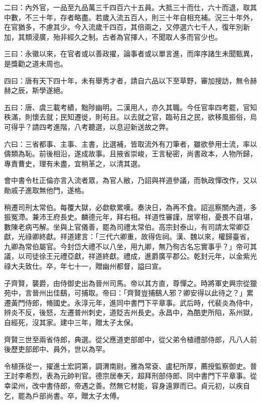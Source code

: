 \begin{pinyinscope}
 二曰：內外官，一品至九品萬三千四百六十五員。大抵三十而仕，六十而退，取其中數，不三十年，存者略盡。若歲入流五百人，則三十年自相充補。況三十年外，在官猶多，不慮其少。今入流歲千四百，其倍兩之，又停選六七千人，復年別新加，其類浸廣，殆非經久之制。古者為官擇人，不聞取人多而官少也。



 三曰：永徽以來，在官者或以善政擢，論事者或以單言進，而庠序諸生未聞甄異，是獎勸之道未周也。



 四曰：唐有天下四十年，未有舉秀才者，請自六品以下至草野，審加搜訪，無令赫赫之辰，斯學遂絕。



 五曰：唐、虞三載考績，黜陟幽明。二漢用人，亦久其職。今任官率四考罷，官知秩滿，則懷去就；民知遷徙，則茍且。以去就之官，臨茍且之民，欲移風振俗，烏可得乎？請四考進階，八考聽選，以息迎新送故之弊。



 六曰：三省都事、主事、主書，比選補，皆取流外有刀筆者，雖欲參用士流，率以儔類為恥。前後相沿，遂成故事。且掖省崇峻，王言秘密，尚書政本，人物所歸，專責曹史，理有未盡，宜稍革之，以清其選。



 會中書令杜正倫亦言入流者眾，為官人敝，乃詔與祥道參議，而執政憚改作，又以勛戚子進取無他門，遂格。



 稍遷司刑太常伯。每覆大獄，必歔欷累嘆。奏決日，為再不食。詔巡察關內道，多振冤滯。兼沛王府長史。麟德元年，拜右相。祥道性審謹，居宰相，憂畏不自堪，數陳老病丐解。坐與上官儀善，罷為司禮太常伯。高宗封泰山，有司請太常卿亞獻，光祿卿終獻。祥道建言：「三代六卿重，故得佐祠。漢、魏以來，權歸臺省，九卿為常伯屬官。今封岱大禮不以八坐，用九卿，無乃徇古名忘實事乎？」帝可其議，以司徒徐王元禮亞獻，祥道終獻。禮成，進爵廣平郡公。乾封元年，以金紫光祿大夫致仕。卒，年七十一，贈幽州都督，謚曰宣。



 子齊賢，襲爵，由侍御史出為晉州司馬。帝以其方直，尊憚之。時將軍史興宗從獵苑中，言晉州出佳鷂，可捕取。帝曰：「齊賢豈捕鷂人邪？卿安得以此待之？」累遷黃門侍郎，脩國史。永淳元年，進同中書門下平章事。武后時，代裴炎為侍中，辨炎不反，後怒，左遷普州刺史，道貶吉州長史。永昌中，為酷吏所陷，系州獄，自經死，沒其家。建中三年，贈太子太保。



 齊賢三世至兩省侍郎，典選。從父應道吏部郎中，從父弟令植禮部侍郎，凡八人前後歷吏部郎中、員外，世以為罕。



 令植孫從一，擢進士宏詞第，調渭南尉。雅為常袞、盧杞所厚，薦授監察御史。普王討李希烈，表為元帥判官。德宗居奉天，超拜刑部侍郎、同中書門下平章事。從幸梁州，改中書侍郎，帝遇之善。然無它材能，容身遠罪而已。貞元初，以疾自乞，罷為戶部尚書。卒，贈太子太傅。




\end{pinyinscope}
